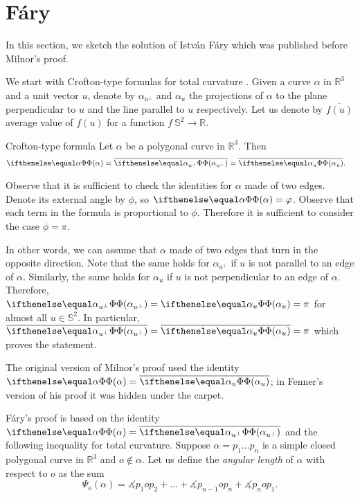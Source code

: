 \section{Fáry}\label{sec:fary}

In this section, we sketch the solution of István Fáry \cite{fary} which was published before Milnor's proof.

We start with Crofton-type formulas for total curvature \cite[Proposition 4.1]{sullivan-curves}.
Given a curve $\alpha$ in $\mathbb{R}^3$ and a unit vector $u$, denote by $\alpha_{u^\perp}$ 
and $\alpha_u$ the projections of $\alpha$ to the plane perpendicular to $u$ and the line parallel to $u$ respectively.
Let us denote by $\overline{f(u)}$ average value of $f(u)$ for a function $f\:\mathbb{S}^2\to\mathbb{R}$.

\begin{thm}{Crofton-type formula}\label{prop:tc-crofton}
Let $\alpha$ be a polygonal curve in $\mathbb{R}^3$.
Then
\begin{align*}
\tc\alpha
&=\overline{\tc{\alpha_{u^\perp}}}
=\overline{\tc{\alpha_u}}.
\end{align*}
\end{thm}


Observe that it is sufficient to check the identities for $\alpha$ made of two edges.
Denote its external angle by $\phi$, so $\tc\alpha=\phi$.
Observe that each term in the formula is proportional to $\phi$.
Therefore it is sufficient to consider the case $\phi=\pi$.

In other words, we can assume that $\alpha$ made of two edges that turn in the opposite direction.
Note that the same holds for $\alpha_{u^\perp}$ if $u$ is not parallel to an edge of $\alpha$.
Similarly, the same holds for $\alpha_u$ if $u$ is not perpendicular to an edge of $\alpha$.
Therefore, $\tc{\alpha_{u^\perp}}=\tc{\alpha_u}=\pi$ for almost all $u\in\mathbb{S}^2$.
In particular, $\overline{\tc{\alpha_{u^\perp}}}=\overline{\tc{\alpha_u}}=\pi$ which proves the statement.
\qeds

The original version of Milnor's proof 
used the identity $\tc\alpha=\overline{\tc{\alpha_u}}$;
in Fenner's version of his proof it was hidden under the carpet.

Fáry's proof is based on the identity $\tc\alpha=\overline{\tc{\alpha_{u^\perp}}}$ and the following inequality for total curvature.
Suppose $\alpha=p_1\dots p_n$ is a simple closed polygonal curve in $\mathbb{R}^3$ and $o\notin\alpha$.
Let us define the \emph{angular length} of $\alpha$ with respect to $o$ as the sum
\[\Psi_o(\alpha)=\measuredangle p_{1} o p_{2}+\dots+\measuredangle p_{n-1} o p_{n}+\measuredangle p_{n} o p_{1}.\]

